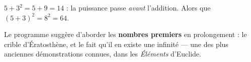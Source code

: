 \documentclass{fiche}
\begin{document}
\begin{piege}
$5+3^{2}=5+9=14$ : la puissance passe \emph{avant} l'addition.
Alors que $(5+3)^{2}=8^{2}=64$.
\end{piege}

\begin{prolongement}
Le programme suggère d'aborder les \textbf{nombres premiers} en prolongement :
le crible d'Ératosthène, et le fait qu'il en existe une infinité — une des plus
anciennes démonstrations connues, dans les \emph{Éléments} d'Euclide.
\end{prolongement}

\begin{videos}
\end{videos}
\end{document}
